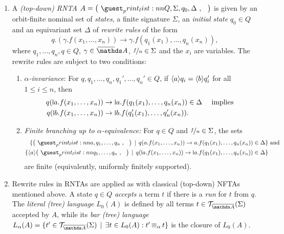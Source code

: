 \documentclass[a4paper,UKenglish,cleveref,autoref,thm-restate,numberwithinsect,final]{lipics-v2021}
\begin{document}
    \begin{defn}
      \begin{enumerate}
        \item A \emph{(top-down) RNTA} $A = \maketuple{Q, \Sigma, q_0, \Delta}$ is given by an orbit-finite
          nominal set of \emph{states}, a finite signature $\Sigma$, an \emph{initial state} $q_0 \in Q$
          and an equivariant set $\Delta$ of \emph{rewrite rules} of the form
          \[ q.(\gamma.f(x_1, \dots, x_n)) \to \gamma.f(q_1(x_1), \dots, q_n(x_n)), \]
          where $q_1, \dots, q_n, q \in Q$, $\gamma \in \barNames$, $\nicefrac{f}{n} \in \Sigma$ and the $x_i$
          are variables. The rewrite rules are subject to two conditions:
          \begin{enumerate}
            \item \emph{$\alpha$-invariance}: For $q,q_1,\dots,q_n,q_1',\dots,q_n' \in Q$, if
              $\langle a \rangle q_i = \langle b \rangle q_i'$ for all $1 \leqslant i \leqslant n$, then
              \begin{align*}
                q(\newletter{a}.f(x_1, \dots, x_n)) & \to \newletter{a}.f(q_1(x_1), \dots, q_n(x_n)) \in \Delta & \text{ implies } \\
                q(\newletter{b}.f(x_1, \dots, x_n)) & \to \newletter{b}.f(q_1'(x_1), \dots, q_n'(x_n)).
              \end{align*}
            \item \emph{Finite branching up to $\alpha$-equivalence:} For $q \in Q$ and $\nicefrac{f}{n} \in \Sigma$,
              the sets
              \begin{align*}
                \setw{\maketuple{a, q_1, \dots, q_n}}{q(a.f(x_1, \dots, x_n)) \to a.f(q_1(x_1), \dots, q_n(x_n)) \in
                \Delta} & \text{ and } \\
                \setw{\braket{a}\maketuple{q_1, \dots, q_n}}{q(\newletter{a}.f(x_1, \dots, x_n)) \to
                  \newletter{a}.f(q_1(x_1), \dots, q_n(x_n)) \in \Delta}
              \end{align*}
              are finite (equivalently, uniformly finitely supported).
          \end{enumerate}
        \item Rewrite rules in RNTAs are applied as with classical (top-down) NFTAs mentioned above.
          A state $q \in Q$ \emph{accepts} a term $t$ if there is a \emph{run} for $t$ from $q$.
          The \emph{literal (tree) language} $L_0(A)$ is defined by all terms $t \in
          \bartree(\Sigma)$ accepted by $A$, while its \emph{bar (tree) language} $L_\alpha(A) =
          \setw{t' \in \bartree(\Sigma)}{\exists t \in L_0(A): t' \alphaequiv t}$ is the closure of $L_0(A)$.
      \end{enumerate}
    \end{defn}
    
\end{document}

